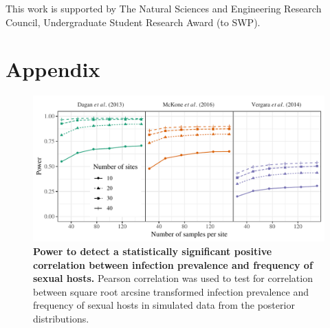 \documentclass{article}\usepackage[]{graphicx}\usepackage[]{color}
\begin{document}
This work is supported by The Natural Sciences and Engineering Research Council, Undergraduate Student Research Award (to SWP).



\pagebreak
\section*{Appendix}

\renewcommand\thefigure{A\arabic{figure}}    
\setcounter{figure}{0}   

\begin{figure}[!ht]
\includegraphics[width=\textwidth]{../fig/power_lm.pdf}
\caption{{\bf Power to detect a statistically significant positive correlation between infection prevalence and frequency of sexual hosts.}
Pearson correlation was used to test for correlation between square root arcsine transformed infection prevalence and frequency of sexual hosts in simulated data from the posterior distributions.
}
\label{fig:power_lm}
\end{figure}
\end{document}
